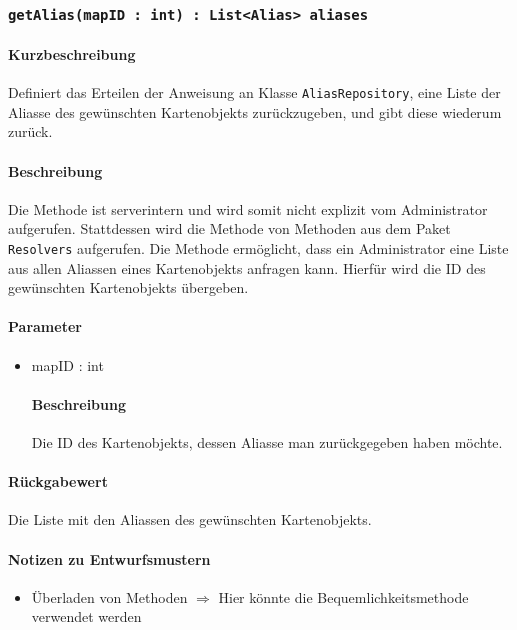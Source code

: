 \subsubsection{\texttt{getAlias(mapID : int) : List<Alias> aliases}}%
\paragraph*{Kurzbeschreibung}
Definiert das Erteilen der Anweisung an Klasse \texttt{AliasRepository}, eine Liste der Aliasse des gewünschten Kartenobjekts zurückzugeben, und gibt diese wiederum zurück.
\paragraph*{Beschreibung}
Die Methode ist serverintern und wird somit nicht explizit vom Administrator aufgerufen.
Stattdessen wird die Methode von Methoden aus dem Paket \texttt{Resolvers} aufgerufen.
Die Methode ermöglicht, dass ein Administrator eine Liste aus allen Aliassen eines Kartenobjekts anfragen kann.
Hierfür wird die ID des gewünschten Kartenobjekts übergeben.
\paragraph*{Parameter}
\begin{itemize}
    \item mapID : int
    		\paragraph*{Beschreibung}
    		Die ID des Kartenobjekts, dessen Aliasse man zurückgegeben haben möchte.
\end{itemize}
\paragraph*{Rückgabewert}
Die Liste mit den Aliassen des gewünschten Kartenobjekts.

\paragraph*{Notizen zu Entwurfsmustern}
\begin{itemize}
	\item Überladen von Methoden $\Rightarrow$ Hier könnte die Bequemlichkeitsmethode verwendet werden
\end{itemize}
